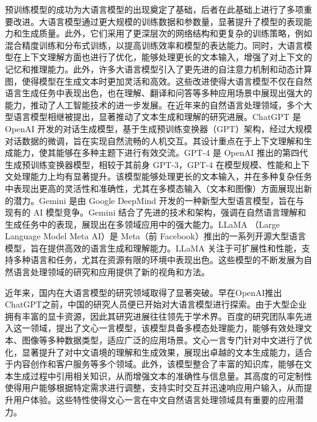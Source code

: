 预训练模型的成功为大语言模型的出现奠定了基础，后者在此基础上进行了多项重要改进。大语言模型通过更大规模的训练数据和参数量，显著提升了模型的表现能力和生成质量。此外，它们采用了更深层次的网络结构和更复杂的训练策略，例如混合精度训练和分布式训练，以提高训练效率和模型的表达能力。同时，大语言模型在上下文理解方面也进行了优化，能够处理更长的文本输入，增强了对上下文的记忆和推理能力。此外，许多大语言模型引入了更先进的自注意力机制和动态计算图，使得模型在生成文本时更加灵活和高效。这些改进使得大语言模型不仅在自然语言生成任务中表现出色，也在理解、翻译和问答等多种应用场景中展现出强大的能力，推动了人工智能技术的进一步发展。在近年来的自然语言处理领域，多个大型语言模型相继被提出，显著推动了文本生成和理解的研究进展。ChatGPT \cite{chatgpt} 是 OpenAI 开发的对话生成模型，基于生成预训练变换器（GPT）架构，经过大规模对话数据的微调，旨在实现自然流畅的人机交互。其设计重点在于上下文理解和生成能力，使其能够在多种主题下进行有效交流。GPT-4 \cite{openai2024gpt4} 是 OpenAI 推出的第四代生成预训练变换器模型，相较于其前身 GPT-3，GPT-4 在模型规模、性能和上下文处理能力上均有显著提升。该模型能够处理更长的文本输入，并在多种复杂任务中表现出更高的灵活性和准确性，尤其在多模态输入（文本和图像）方面展现出新的潜力。Gemini \cite{geminiteam} 是由 Google DeepMind 开发的一种新型大型语言模型，旨在与现有的 AI 模型竞争。Gemini 结合了先进的技术和架构，强调在自然语言理解和生成任务中的表现，展现出在多领域应用中的强大能力。LLaMA \cite{touvron2023llamaopenefficientfoundation, touvron2023llama2openfoundation, grattafiori2024llama3herdmodels} （Large Language Model Meta AI）是 Meta（前 Facebook）推出的一系列开源大型语言模型，旨在提供高效的语言生成和理解能力。LLaMA 关注于可扩展性和性能，支持多种语言和任务，尤其在资源有限的环境中表现出色。这些模型的不断发展为自然语言处理领域的研究和应用提供了新的视角和方法。


近年来，国内在大语言模型的研究领域取得了显著突破。早在OpenAI推出ChatGPT之前，中国的研究人员便已开始对大语言模型进行探索。由于大型企业拥有丰富的显卡资源，因此其研究进展往往领先于学术界。百度的研究团队率先进入这一领域，提出了文心一言模型\cite{sun2019ernieenhancedrepresentationknowledge, sun2019ernie20continualpretraining, sun2021ernie30largescaleknowledge}，该模型具备多模态处理能力，能够有效处理文本、图像等多种数据类型，适应广泛的应用场景。文心一言专门针对中文进行了优化，显著提升了对中文语境的理解和生成效果，展现出卓越的文本生成能力，适合于内容创作和客户服务等多个领域。此外，该模型整合了丰富的知识库，能够在文本生成过程中引用相关知识，从而增强文本的准确性与信息量。其高度的可定制性使得用户能够根据特定需求进行调整，支持实时交互并迅速响应用户输入，从而提升用户体验。这些特性使得文心一言在中文自然语言处理领域具有重要的应用潜力。

